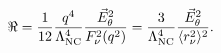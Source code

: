 \begin{equation}
\Re=\frac{1}{12}\frac{q^4}{\Lambda_{\rm NC}^4}\frac{{\vec E}^2_{\theta}}{F^2_{\nu}(q^2)}
=\frac{3}{\Lambda_{\rm NC}^4}\frac{{\vec E}^2_{\theta}}{\langle r^2_{\nu}\rangle^2}.
\end{equation}

